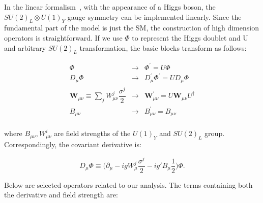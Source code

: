 In the linear formalism~\cite{Eboli:2006wa}, with the appearance of a
Higgs boson, the $SU(2)_L \otimes U(1)_Y$ gauge symmetry can be
implemented linearly. Since the fundamental part of the model is just
the SM, the construction of high dimension operators is
straightforward. If we use $\Phi$ to represent the Higgs doublet and U
and arbitrary $SU(2)_L$ transformation, the basic blocks transform as
follows:

\begin{eqnarray}
\Phi &  \to   & \Phi^{\prime}=U\Phi \nonumber \\
D_{\mu}\Phi & \to   & D^{\prime}_{\mu}\Phi^{\prime}=UD_{\mu}\Phi \nonumber \\
\mathbf{W}_{\mu \nu}\equiv \sum_{j}W^{j}_{\mu \nu} \dfrac{\sigma^{j}}{2} &  \to   & \mathbf{W}^{\prime}_{\mu \nu}= U\mathbf{W}_{\mu\nu}U^{\dagger} \nonumber \\
B_{\mu \nu}  &   \to   & B^{\prime}_{\mu \nu}=B_{\mu \nu} \nonumber \\
\label{linear:blocks}
\end{eqnarray}

where $B_{\mu \nu}, W_{\mu \nu}^i$ are field strengths of the $U(1)_Y$
and $SU(2)_L$ group. Correspondingly, the covariant derivative is:

\begin{equation}
D_{\mu}\Phi \equiv \Big( \partial_{\mu} - i g W_{\mu}^j \frac{\sigma^j}{2} - i g' B_{\mu} \frac{1}{2} \Big) \Phi .
\end{equation}

Below are selected operators related to our analysis.
The terms containing both the derivative and field strength are:

